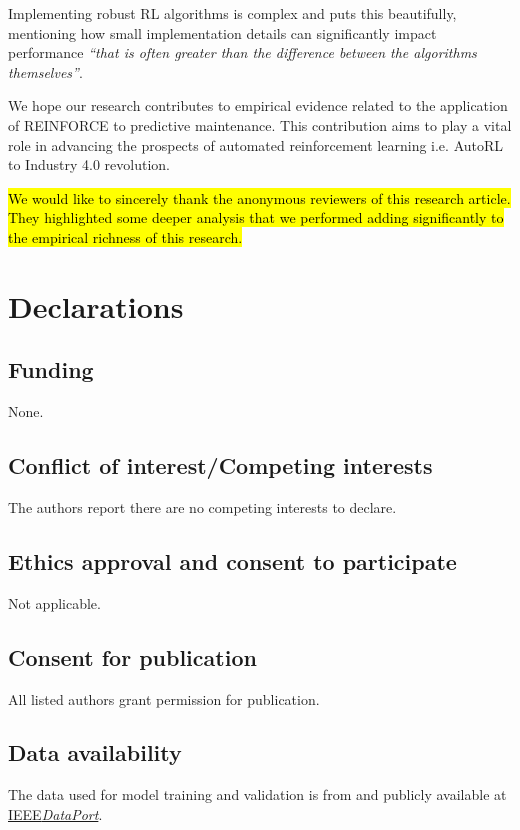 \documentclass[referee, sn-mathphys-num]{sn-jnl}
\newcommand{\hlc}[2][cyan!15]{{\colorlet{foo}{#1}\sethlcolor{foo}\hl{#2}}}
\begin{document}
	Implementing robust RL algorithms is complex and \cite{SB3-paper} puts this beautifully, mentioning how small implementation details can significantly impact performance \textit{``that is often greater than the difference between the algorithms themselves''}. 
	
	We hope our research contributes to empirical evidence related to the application of REINFORCE to predictive maintenance. This contribution aims to play a vital role in advancing the prospects of automated reinforcement learning i.e. AutoRL to Industry 4.0 revolution.
	
	\backmatter
	
	
	\hlc{We would like to sincerely thank the anonymous reviewers of this research article. They highlighted some deeper analysis that we performed adding significantly to the empirical richness of this research.}
	
	\section*{Declarations}
	
	\subsection*{Funding}
	None.
	\subsection*{Conflict of interest/Competing interests}
	The authors report there are no competing interests to declare.
	
	\subsection*{Ethics approval and consent to participate}
	Not applicable.
	
	\subsection*{Consent for publication}
	All listed authors grant permission for publication.
	
	\subsection*{Data availability}
	The data used for model training and validation is from \cite{PHM-dataset} and publicly available at \href{https://doi.org/10.21227/jdxd-yy51}{IEEE\textit{DataPort}}. 
	
\end{document}
